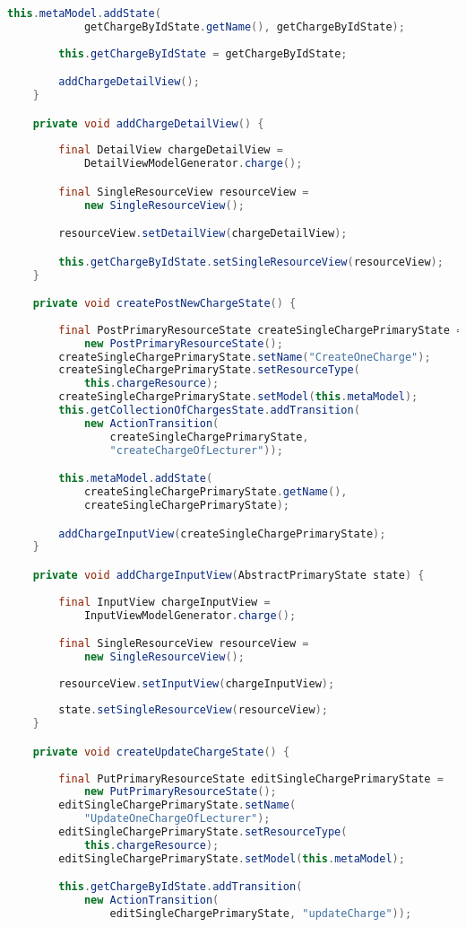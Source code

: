 \begin{lstlisting}[label=lst:enfield_model,
language=java,
firstnumber=1,
caption=Beschreibung des \textit{Enfield-Modell} der Referenzimplementierung. ]
		this.metaModel.addState(
			getChargeByIdState.getName(), getChargeByIdState);
	
		this.getChargeByIdState = getChargeByIdState;

		addChargeDetailView();
	}

	private void addChargeDetailView() {
	
		final DetailView chargeDetailView =
			DetailViewModelGenerator.charge();

		final SingleResourceView resourceView = 
			new SingleResourceView();

		resourceView.setDetailView(chargeDetailView);

		this.getChargeByIdState.setSingleResourceView(resourceView);
	}

	private void createPostNewChargeState() {
	
		final PostPrimaryResourceState createSingleChargePrimaryState = 
			new PostPrimaryResourceState();
		createSingleChargePrimaryState.setName("CreateOneCharge");
		createSingleChargePrimaryState.setResourceType(
			this.chargeResource);
		createSingleChargePrimaryState.setModel(this.metaModel);
		this.getCollectionOfChargesState.addTransition(
			new ActionTransition(
				createSingleChargePrimaryState, 
				"createChargeOfLecturer"));

		this.metaModel.addState(
			createSingleChargePrimaryState.getName(), 
			createSingleChargePrimaryState);

		addChargeInputView(createSingleChargePrimaryState);
	}

	private void addChargeInputView(AbstractPrimaryState state) {
	
		final InputView chargeInputView = 
			InputViewModelGenerator.charge();

		final SingleResourceView resourceView = 
			new SingleResourceView();
	
		resourceView.setInputView(chargeInputView);
	
		state.setSingleResourceView(resourceView);
	}

	private void createUpdateChargeState() {
	
		final PutPrimaryResourceState editSingleChargePrimaryState = 
			new PutPrimaryResourceState();
		editSingleChargePrimaryState.setName(
			"UpdateOneChargeOfLecturer");
		editSingleChargePrimaryState.setResourceType(
			this.chargeResource);
		editSingleChargePrimaryState.setModel(this.metaModel);

		this.getChargeByIdState.addTransition(
			new ActionTransition(
				editSingleChargePrimaryState, "updateCharge"));


\end{lstlisting}

